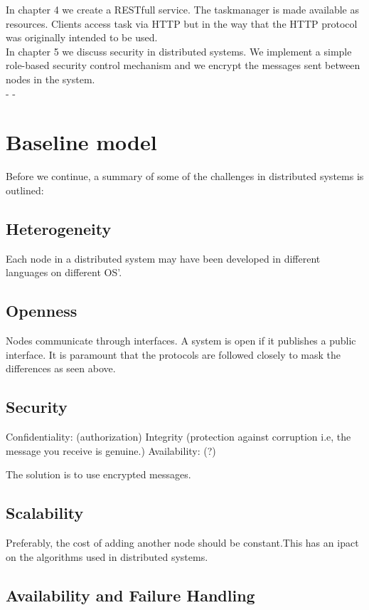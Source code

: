 In chapter 4 we create a RESTfull service. The taskmanager is made available as resources. 
Clients access task via HTTP but in the way that the HTTP protocol was originally intended to be used. \\

In chapter 5 we discuss security in distributed systems. We implement a simple role-based security control mechanism and we encrypt the messages sent between nodes in the system.    \\
-
-
\section{Baseline model}

Before we continue, a summary of some of the challenges in distributed systems is outlined:

\subsection{Heterogeneity}
Each node in a distributed system may have been developed in different languages on different OS’.   

\subsection{Openness}

Nodes communicate through interfaces. A system is open if it publishes a public interface. It is paramount that the protocols are followed closely to mask the differences as seen above. 

\subsection{Security}

Confidentiality: (authorization)
Integrity (protection against corruption i.e, the message you receive is genuine.)
Availability: (?)


The solution is to use encrypted messages.

\subsection{Scalability}

Preferably, the cost of adding another node should be constant.This has an ipact on the algorithms used in distributed systems.

\subsection{Availability and Failure Handling}

